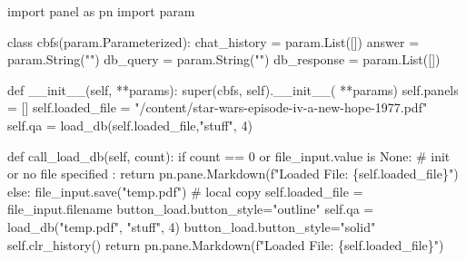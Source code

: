 \documentclass[
  letterpaper,
  DIV=11,
  numbers=noendperiod]{scrreprt}
\newenvironment{Shaded}{\begin{snugshade}}{\end{snugshade}}
\newcommand{\BuiltInTok}[1]{\textcolor[rgb]{0.00,0.23,0.31}{#1}}
\newcommand{\CommentTok}[1]{\textcolor[rgb]{0.37,0.37,0.37}{#1}}
\newcommand{\ControlFlowTok}[1]{\textcolor[rgb]{0.00,0.23,0.31}{#1}}
\newcommand{\DecValTok}[1]{\textcolor[rgb]{0.68,0.00,0.00}{#1}}
\newcommand{\FunctionTok}[1]{\textcolor[rgb]{0.28,0.35,0.67}{#1}}
\newcommand{\ImportTok}[1]{\textcolor[rgb]{0.00,0.46,0.62}{#1}}
\newcommand{\KeywordTok}[1]{\textcolor[rgb]{0.00,0.23,0.31}{#1}}
\newcommand{\NormalTok}[1]{\textcolor[rgb]{0.00,0.23,0.31}{#1}}
\newcommand{\OperatorTok}[1]{\textcolor[rgb]{0.37,0.37,0.37}{#1}}
\newcommand{\SpecialCharTok}[1]{\textcolor[rgb]{0.37,0.37,0.37}{#1}}
\newcommand{\SpecialStringTok}[1]{\textcolor[rgb]{0.13,0.47,0.30}{#1}}
\newcommand{\StringTok}[1]{\textcolor[rgb]{0.13,0.47,0.30}{#1}}
\newcommand{\VariableTok}[1]{\textcolor[rgb]{0.07,0.07,0.07}{#1}}
\begin{document}
\begin{Shaded}
\begin{Highlighting}[]
\ImportTok{import}\NormalTok{ panel }\ImportTok{as}\NormalTok{ pn}
\ImportTok{import}\NormalTok{ param}

\KeywordTok{class}\NormalTok{ cbfs(param.Parameterized):}
\NormalTok{    chat\_history }\OperatorTok{=}\NormalTok{ param.List([])}
\NormalTok{    answer }\OperatorTok{=}\NormalTok{ param.String(}\StringTok{""}\NormalTok{)}
\NormalTok{    db\_query  }\OperatorTok{=}\NormalTok{ param.String(}\StringTok{""}\NormalTok{)}
\NormalTok{    db\_response }\OperatorTok{=}\NormalTok{ param.List([])}

    \KeywordTok{def} \FunctionTok{\_\_init\_\_}\NormalTok{(}\VariableTok{self}\NormalTok{,  }\OperatorTok{**}\NormalTok{params):}
        \BuiltInTok{super}\NormalTok{(cbfs, }\VariableTok{self}\NormalTok{).}\FunctionTok{\_\_init\_\_}\NormalTok{( }\OperatorTok{**}\NormalTok{params)}
        \VariableTok{self}\NormalTok{.panels }\OperatorTok{=}\NormalTok{ []}
        \VariableTok{self}\NormalTok{.loaded\_file }\OperatorTok{=} \StringTok{"/content/star{-}wars{-}episode{-}iv{-}a{-}new{-}hope{-}1977.pdf"}
        \VariableTok{self}\NormalTok{.qa }\OperatorTok{=}\NormalTok{ load\_db(}\VariableTok{self}\NormalTok{.loaded\_file,}\StringTok{"stuff"}\NormalTok{, }\DecValTok{4}\NormalTok{)}

    \KeywordTok{def}\NormalTok{ call\_load\_db(}\VariableTok{self}\NormalTok{, count):}
        \ControlFlowTok{if}\NormalTok{ count }\OperatorTok{==} \DecValTok{0} \KeywordTok{or}\NormalTok{ file\_input.value }\KeywordTok{is} \VariableTok{None}\NormalTok{:  }\CommentTok{\# init or no file specified :}
            \ControlFlowTok{return}\NormalTok{ pn.pane.Markdown(}\SpecialStringTok{f"Loaded File: }\SpecialCharTok{\{}\VariableTok{self}\SpecialCharTok{.}\NormalTok{loaded\_file}\SpecialCharTok{\}}\SpecialStringTok{"}\NormalTok{)}
        \ControlFlowTok{else}\NormalTok{:}
\NormalTok{            file\_input.save(}\StringTok{"temp.pdf"}\NormalTok{)  }\CommentTok{\# local copy}
            \VariableTok{self}\NormalTok{.loaded\_file }\OperatorTok{=}\NormalTok{ file\_input.filename}
\NormalTok{            button\_load.button\_style}\OperatorTok{=}\StringTok{"outline"}
            \VariableTok{self}\NormalTok{.qa }\OperatorTok{=}\NormalTok{ load\_db(}\StringTok{"temp.pdf"}\NormalTok{, }\StringTok{"stuff"}\NormalTok{, }\DecValTok{4}\NormalTok{)}
\NormalTok{            button\_load.button\_style}\OperatorTok{=}\StringTok{"solid"}
        \VariableTok{self}\NormalTok{.clr\_history()}
        \ControlFlowTok{return}\NormalTok{ pn.pane.Markdown(}\SpecialStringTok{f"Loaded File: }\SpecialCharTok{\{}\VariableTok{self}\SpecialCharTok{.}\NormalTok{loaded\_file}\SpecialCharTok{\}}\SpecialStringTok{"}\NormalTok{)}


\end{Highlighting}
\end{Shaded}
\end{document}
